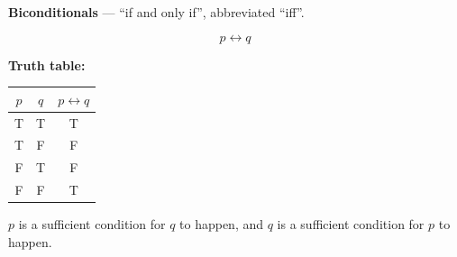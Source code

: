 \documentclass{article}
\begin{document}
\bigskip

\textbf{Biconditionals} --- ``if and only if'', abbreviated ``iff''.

\[
p \leftrightarrow q
\]

\medskip

\textbf{Truth table:}
\begin{center}
\begin{tabular}{cc|c}
$p$ & $q$ & $p \leftrightarrow q$ \\
\hline
T & T & T \\
T & F & F \\
F & T & F \\
F & F & T
\end{tabular}
\end{center}

\medskip

$p$ is a sufficient condition for $q$ to happen, and $q$ is a sufficient condition for $p$ to happen.
\end{document}
